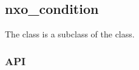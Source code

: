 %
%
%
%
%              

\subsection{nxo\_condition}
\label{nxo_condition}

The  class is a subclass of the  class.

\subsubsection{API}
